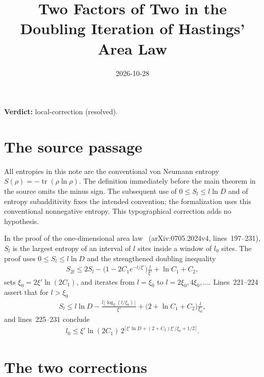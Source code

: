 \documentclass{article}
\title{Two Factors of Two in the Doubling Iteration of Hastings' Area Law}
\author{}
\date{2026-10-28}
\providecommand{\gapnote}[2]{\par\noindent\textbf{Verdict:} #1 (#2).\par}
\begin{document}
\maketitle
\gapnote{local-correction}{resolved}

\section{The source passage}

All entropies in this note are the conventional von Neumann entropy
$S(\rho)=-\operatorname{tr}(\rho\ln\rho)$. The definition immediately
before the main theorem in the source omits the minus sign. The subsequent
use of $0\le S_l\le l\ln D$ and of entropy subadditivity fixes the intended
convention; the formalization uses this conventional nonnegative entropy.
This typographical correction adds no hypothesis.


In the proof of the one-dimensional area law~\cite{Hastings2007AreaLaw}
(arXiv:0705.2024v4, lines~197--231), $S_l$ is the largest entropy of an
interval of $l$ sites inside a window of $l_0$ sites. The proof uses
$0\le S_l\le l\ln D$ and the strengthened doubling inequality
\begin{align}
    S_{2l}\le 2S_l-\bigl(1-2C_1e^{-l/\xi'}\bigr)\frac{l}{\xi'}+\ln C_1+C_2 ,
    \label{eq:hastings07_doubling_constants_claim}
\end{align}
sets $\xi_0=2\xi'\ln(2C_1)$, and iterates from $l=\xi_0$ to
$l=2\xi_0,4\xi_0,\dots$. Lines~221--224 assert that for $l>\xi_0$
\begin{align}
    S_l\le l\ln D-\frac{l\lfloor\log_2(l/\xi_0)\rfloor}{\xi'}
    +\bigl(2+\ln C_1+C_2\bigr)\frac{l}{\xi_0},
    \label{eq:hastings07_doubling_constants_source_bound}
\end{align}
and lines~225--231 conclude
\begin{align}
    l_0\le\xi'\ln(2C_1)\,
    2^{\lceil\xi'\ln D+(2+C_2)\xi'/\xi_0+1/2\rceil}.
    \label{eq:hastings07_doubling_constants_source_window}
\end{align}

\section{The two corrections}
\end{document}
